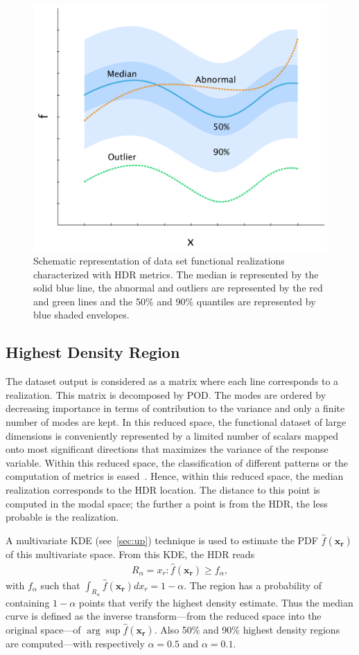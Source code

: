 \begin{figure}[!ht]
\centering
\includegraphics[width=0.6\linewidth,keepaspectratio]{fig/literature/pattern_hdr.pdf}
\caption{Schematic representation of data set functional realizations characterized with HDR metrics. The median is represented by the solid blue line, the abnormal and outliers are represented by the red and green lines and the 50\% and 90\% quantiles are represented by blue shaded envelopes.}
\label{fig:pattern_hdr}
\end{figure}

\subsection{Highest Density Region}
\label{sec:HDR}

The dataset output is considered as a matrix where each line corresponds to a realization. This matrix is decomposed by POD. The modes are ordered by decreasing importance in terms of contribution to the variance and only a finite number of modes are kept. In this reduced space, the functional dataset of large dimensions is conveniently represented by a limited number of scalars mapped onto most significant directions that maximizes the variance of the response variable. Within this reduced space, the classification of different patterns or the computation of metrics is eased~\citep{Ren2017}. Hence, within this reduced space, the median realization corresponds to the HDR location. The distance to this point is computed in the modal space; the further a point is from the HDR, the less probable is the realization.

A multivariate KDE (see~\cref{sec:up}) technique is used to estimate the PDF $\hat{f}(\mathbf{x_r})$ of this multivariate space. From this KDE, the HDR reads
\begin{align}
R_\alpha = {x_r: \hat{f}(\mathbf{x_r}) \geq f_{\alpha}},
\end{align}
\noindent with $f_{\alpha}$ such that $\int_{R_\alpha} \hat{f}(\mathbf{x_r}) d x_r = 1 - \alpha$. The region has a probability of containing $1-\alpha$ points that verify the highest density estimate. Thus the median curve is defined as the inverse transform---from the reduced space into the original space---of $\arg \sup \hat{f}(\mathbf{x_r})$. Also 50\% and 90\% highest density regions are computed---with respectively $\alpha=0.5$ and $\alpha=0.1$.

